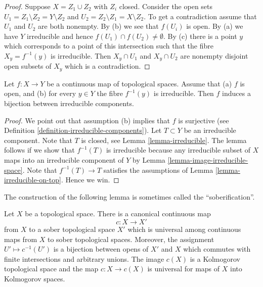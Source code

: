 \begin{proof}
Suppose $X = Z_1 \cup Z_2$ with $Z_i$ closed.
Consider the open sets $U_1 = Z_1 \setminus Z_2 = Y \setminus Z_2$ and
$U_2 = Z_2 \setminus Z_1 = X \setminus Z_2$. To get a contradiction
assume that $U_1$ and $U_2$ are both nonempty. By (b) we see that $f(U_i)$
is open. By (a) we have $Y$ irreducible and hence
$f(U_1) \cap f(U_2) \not = \emptyset$. By (c) there is a point $y$ which
corresponds to a point of this intersection such that the fibre
$X_y = f^{-1}(y)$ is irreducible. Then $X_y \cap U_1$ and
$X_y \cap U_2$ are nonempty disjoint open subsets of $X_y$ which is
a contradiction.
\end{proof}

\begin{lemma}
\label{lemma-irreducible-fibres-irreducible-components}
Let $f : X \to Y$ be a continuous map of topological spaces.
Assume that (a) $f$ is open, and
(b) for every $y \in Y$ the fibre $f^{-1}(y)$ is irreducible.
Then $f$ induces a bijection between irreducible components.
\end{lemma}

\begin{proof}
We point out that assumption (b) implies that $f$ is surjective (see
Definition \ref{definition-irreducible-components}).
Let $T \subset Y$ be an irreducible component.
Note that $T$ is closed, see Lemma \ref{lemma-irreducible}.
The lemma follows if we show that $f^{-1}(T)$ is irreducible
because any irreducible subset of $X$ maps into an irreducible component
of $Y$ by Lemma \ref{lemma-image-irreducible-space}.
Note that $f^{-1}(T) \to T$ satisfies the assumptions
of Lemma \ref{lemma-irreducible-on-top}. Hence we win.
\end{proof}

\noindent
The construction of the following lemma is sometimes called
the ``soberification''.

\begin{lemma}
\label{lemma-make-sober}
Let $X$ be a topological space. There is a canonical continuous map
$$
c : X \longrightarrow X'
$$
from $X$ to a sober topological space $X'$ which is universal
among continuous maps from $X$ to sober topological spaces.
Moreover, the assignment $U' \mapsto c^{-1}(U')$ is a bijection
between opens of $X'$ and $X$ which commutes with finite intersections
and arbitrary unions.
The image $c(X)$ is a Kolmogorov topological space and the
map $c : X \to c(X)$ is universal for maps of $X$ into Kolmogorov spaces.
\end{lemma}


